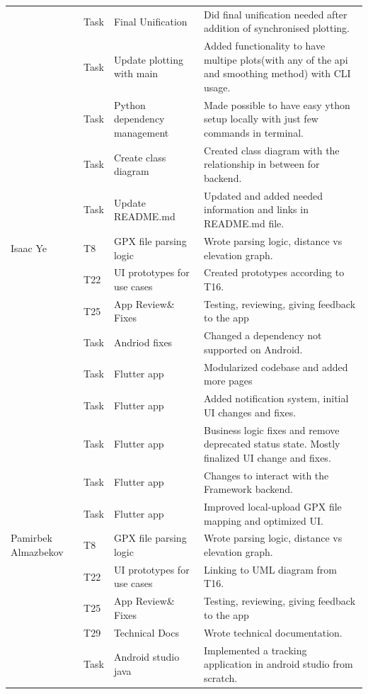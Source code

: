 \documentclass[12pt]{article}
\begin{document}
\begin{longtable}{p{3cm} p{1.5cm} p{4cm} p{7cm}}
& Task & Final Unification & Did final unification needed after addition of synchronised plotting. \\
& Task & Update plotting with main & Added functionality to have multipe plots(with any of the api and smoothing method) with CLI usage. \\
& Task & Python dependency management & Made possible to have easy ython setup locally with just few commands in terminal. \\
& Task & Create class diagram & Created class diagram with the relationship in between for backend. \\
& Task & Update README.md & Updated and added needed information and links in README.md file. \\
\midrule
Isaac Ye & T8 & GPX file parsing logic & Wrote parsing logic, distance vs elevation graph. \\
& T22 & UI prototypes for use cases & Created prototypes according to T16. \\
& T25 & App Review\& Fixes & Testing, reviewing, giving feedback to the app \\
& Task & Andriod fixes & Changed a dependency not supported on Android.\\
& Task & Flutter app & Modularized codebase and added more pages \\ 
& Task & Flutter app & Added notification system, initial UI changes and fixes. \\
& Task & Flutter app & Business logic fixes and remove deprecated status state. Mostly finalized UI change and fixes.\\
& Task & Flutter app & Changes to interact with the Framework backend.\\         
& Task & Flutter app & Improved local-upload GPX file mapping and optimized UI.\\   
\midrule
Pamirbek Almazbekov & T8 & GPX file parsing logic & Wrote parsing logic, distance vs elevation graph. \\
& T22 & UI prototypes for use cases & Linking to UML diagram from T16. \\
& T25 & App Review\& Fixes & Testing, reviewing, giving feedback to the app \\
& T29 & Technical Docs & Wrote technical documentation. \\
& Task & Android studio java & Implemented a tracking application in android studio from scratch. \\

\bottomrule
\end{longtable}
\end{document}
